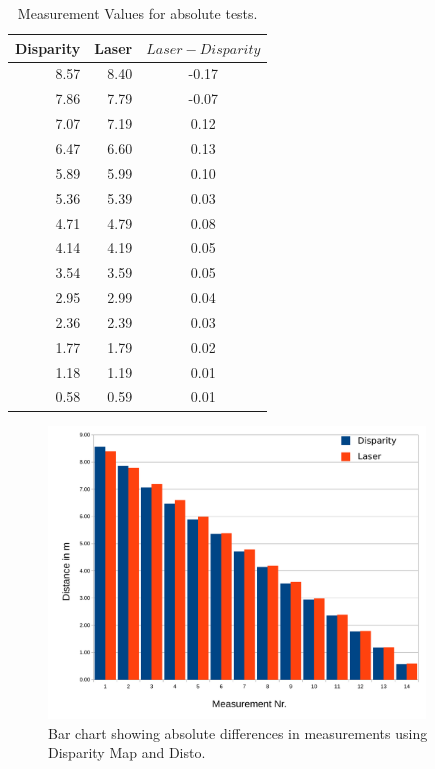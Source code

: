 \documentclass[11pt]{article}
\begin{document}
\begin{table}[htbp]
	\begin{center}
	\begin{tabular}{|r|r|c|}
	\hline
	\multicolumn{1}{|l|}{Disparity} & \multicolumn{1}{l|}{Laser} & \multicolumn{1}{l|}{$Laser - Disparity$} \\ \hline
	8.57 & 8.40 & -0.17 \\ \hline
	7.86 & 7.79 & -0.07 \\ \hline
	7.07 & 7.19 & 0.12 \\ \hline
	6.47 & 6.60 & 0.13 \\ \hline
	5.89 & 5.99 & 0.10 \\ \hline
	5.36 & 5.39 & 0.03 \\ \hline
	4.71 & 4.79 & 0.08 \\ \hline
	4.14 & 4.19 & 0.05 \\ \hline
	3.54 & 3.59 & 0.05 \\ \hline
	2.95 & 2.99 & 0.04 \\ \hline
	2.36 & 2.39 & 0.03 \\ \hline
	1.77 & 1.79 & 0.02 \\ \hline
	1.18 & 1.19 & 0.01 \\ \hline
	0.58 & 0.59 & 0.01 \\ \hline
	\end{tabular}
	\end{center}
	\caption{Measurement Values for absolute tests.}
	\label{table:absolute-table}
\end{table}

\begin{figure}[H]
        \centering
        \includegraphics[width=10cm]{images/absolute-measurements.pdf}
       	\caption{Bar chart showing absolute differences in measurements using Disparity Map and Disto.}
        \label{fig:absolute-chart}
\end{figure}
\end{document}
